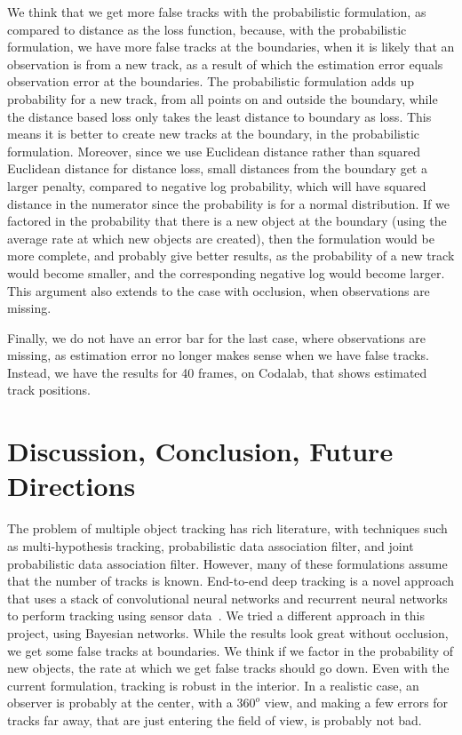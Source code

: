 \documentclass[a4paper]{article}
\begin{document}
We think that we get more false tracks with the probabilistic formulation,
as compared to distance as the loss function, because,
with the probabilistic formulation, we have more false tracks at the boundaries,
when it is likely that an observation is from a new
track, as a result of which the estimation error equals observation error at
the boundaries.
The probabilistic formulation adds up probability for a new track,
from all points on and outside the boundary, while the distance based loss
only takes the least distance to boundary as loss.
This means it is better to create new tracks at the boundary, in the probabilistic
formulation.
Moreover, since we use Euclidean distance rather than squared Euclidean distance
for distance loss, small distances from the boundary get a larger penalty, compared
to negative log probability, which will have squared distance in the numerator
since the probability is for a normal distribution.
If we factored in the probability that there is a new object at the boundary
(using the average rate at which new objects are created), then the formulation
would be more complete, and probably give better results,
as the probability of a new track would become smaller, and the corresponding
negative log would become larger.
This argument also extends to the case with occlusion, when observations are missing.

Finally, we do not have an error bar for the last case, where observations
are missing, as estimation error no longer makes sense when we have false
tracks. Instead, we have the results for 40 frames, on Codalab, that shows
estimated track positions.


\section{Discussion, Conclusion, Future Directions}

The problem of multiple object tracking has rich literature, with
techniques such as multi-hypothesis tracking, probabilistic data association
filter, and joint probabilistic data association filter.
However, many of these formulations assume that the number of tracks is known.
End-to-end deep tracking is a novel approach that uses a stack of convolutional
neural networks and recurrent neural networks to perform tracking using sensor
data~\cite{deeptracking}.
We tried a different approach in this project, using Bayesian networks.
While the results look great without occlusion, we get some false tracks at
boundaries.
We think if we factor in the probability of new objects, the rate at which
we get false tracks should go down.
Even with the current formulation, tracking is robust in the interior.
In a realistic case, an observer is probably at the center, with a $360^o$
view, and making a few errors for tracks far away, that are just entering the 
field of view, is probably not bad.
\end{document}
